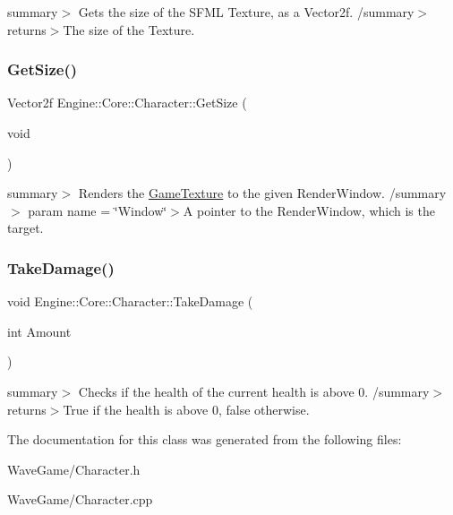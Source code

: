 summary$>$ Gets the size of the S\+F\+ML Texture, as a Vector2f. /summary$>$ returns$>$The size of the Texture.\mbox{\label{class_engine_1_1_core_1_1_character_a3465481aed27d24909b8e40577f09b10}} 
\subsubsection{\texorpdfstring{Get\+Size()}{GetSize()}}
{\footnotesize\ttfamily Vector2f Engine\+::\+Core\+::\+Character\+::\+Get\+Size (\begin{DoxyParamCaption}\item[{void}]{ }\end{DoxyParamCaption})}

summary$>$ Renders the \hyperlink{class_engine_1_1_core_1_1_game_texture}{Game\+Texture} to the given Render\+Window. /summary$>$ param name = \char`\"{}\+Window\char`\"{}$>$A pointer to the Render\+Window, which is the target.\mbox{\label{class_engine_1_1_core_1_1_character_a2156c371584ca6a8d2961154f1b49c09}} 
\subsubsection{\texorpdfstring{Take\+Damage()}{TakeDamage()}}
{\footnotesize\ttfamily void Engine\+::\+Core\+::\+Character\+::\+Take\+Damage (\begin{DoxyParamCaption}\item[{int}]{Amount }\end{DoxyParamCaption})}

summary$>$ Checks if the health of the current health is above 0. /summary$>$ returns$>$True if the health is above 0, false otherwise.

The documentation for this class was generated from the following files\+:\begin{DoxyCompactItemize}
\item 
Wave\+Game/Character.\+h\item 
Wave\+Game/Character.\+cpp\end{DoxyCompactItemize}

